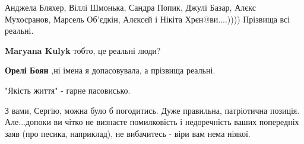\begin{itemize}
 

Анджела Бляхер, Віллі Шмонька, Сандра Попик, Джулі Базар, Алєкс Мухосранов,
Марсель Об'єдкін, Алєксєй і Нікіта Хрєн@ви....)))) Прізвища всі реальні.

\begin{itemize}
 
\textbf{Maryana Kulyk} тобто, це реальні люди?

 
\textbf{Орелі Боян} ,ні імена я допасовувала, а прізвища реальні.
\end{itemize}

 
"Якість життя" - гарне пасовисько.

 

З вами, Сергію, можна було б погодитись. Дуже правильна, патріотична позиція.
Але...допоки ви чітко не визнаєте помилковість і недоречність ваших попередніх
заяв (про песика, наприклад), не вибачитесь - віри вам нема ніякої.



\end{itemize}
